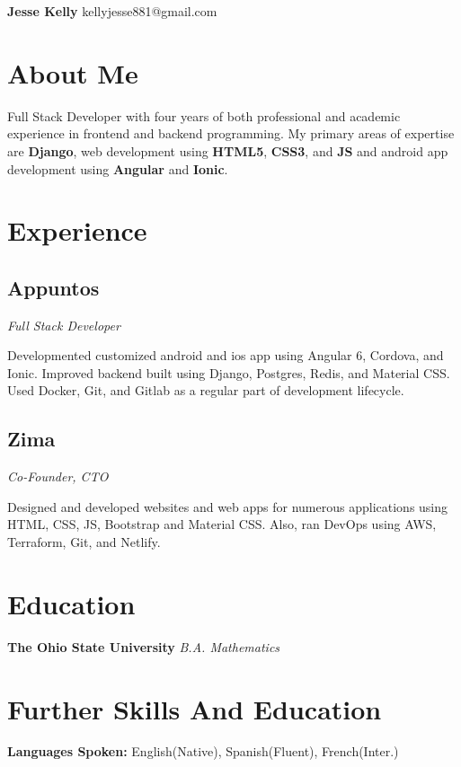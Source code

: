 \documentclass[letterpaper,11pt]{article}
\begin{document}
\begin{flushleft}
\Large{\textbf{Jesse Kelly}}
\newline
kellyjesse881@gmail.com
\end{flushleft}

\section{About Me}
Full Stack Developer with four years of both
professional and academic experience in frontend
and backend programming. My primary areas of
expertise are \textbf{Django}, web development using \textbf{HTML5},
\textbf{CSS3}, and \textbf{JS} and android app development using
\textbf{Angular} and \textbf{Ionic}.

\section{Experience}
\subsection{Appuntos}
\textit{Full Stack Developer}

Developmented customized android and ios
app using Angular 6, Cordova, and Ionic.
Improved backend built using Django,
Postgres, Redis, and Material CSS. Used
Docker, Git, and Gitlab as a regular part
of development lifecycle.

\subsection{Zima}
\textit{Co-Founder, CTO}

Designed and developed websites and web
apps for numerous applications using
HTML, CSS, JS, Bootstrap and Material CSS.
Also, ran DevOps using AWS, Terraform,
Git, and Netlify.

\section{Education}
\textbf{The Ohio State University}
\newline
\textit{B.A. Mathematics}

\section{Further Skills And Education}
\textbf{Languages Spoken: } English(Native), Spanish(Fluent), French(Inter.)
\end{document}
